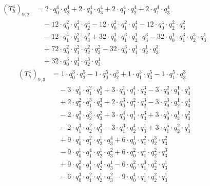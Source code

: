 \begin{align*}(T_{h}^4)_{9,2}&=2\cdot q_0^{4}\cdot q_2^{4}+2\cdot q_0^{4}\cdot q_3^{4}+2\cdot q_1^{4}\cdot q_2^{4}+2\cdot q_1^{4}\cdot q_3^{4}\\
&\quad -12\cdot q_0^{2}\cdot q_1^{2}\cdot q_2^{4}-12\cdot q_0^{2}\cdot q_1^{2}\cdot q_3^{4}-12\cdot q_0^{4}\cdot q_2^{2}\cdot q_3^{2}\\
&\quad -12\cdot q_1^{4}\cdot q_2^{2}\cdot q_3^{2}+32\cdot q_0^{1}\cdot q_1^{3}\cdot q_2^{1}\cdot q_3^{3}-32\cdot q_0^{1}\cdot q_1^{3}\cdot q_2^{3}\cdot q_3^{1}\\
&\quad +72\cdot q_0^{2}\cdot q_1^{2}\cdot q_2^{2}\cdot q_3^{2}-32\cdot q_0^{3}\cdot q_1^{1}\cdot q_2^{1}\cdot q_3^{3}\\
&\quad +32\cdot q_0^{3}\cdot q_1^{1}\cdot q_2^{3}\cdot q_3^{1}\end{align*}
\begin{align*}(T_{h}^4)_{9,3}&=1\cdot q_0^{3}\cdot q_2^{5}-1\cdot q_0^{5}\cdot q_2^{3}+1\cdot q_1^{3}\cdot q_3^{5}-1\cdot q_1^{5}\cdot q_3^{3}\\
&\quad -3\cdot q_0^{1}\cdot q_1^{2}\cdot q_2^{5}+3\cdot q_0^{1}\cdot q_1^{4}\cdot q_2^{3}-3\cdot q_0^{2}\cdot q_1^{1}\cdot q_3^{5}\\
&\quad +2\cdot q_0^{2}\cdot q_1^{3}\cdot q_3^{3}+2\cdot q_0^{3}\cdot q_1^{2}\cdot q_2^{3}-3\cdot q_0^{3}\cdot q_2^{1}\cdot q_3^{4}\\
&\quad -2\cdot q_0^{3}\cdot q_2^{3}\cdot q_3^{2}+3\cdot q_0^{4}\cdot q_1^{1}\cdot q_3^{3}+3\cdot q_0^{5}\cdot q_2^{1}\cdot q_3^{2}\\
&\quad -2\cdot q_1^{3}\cdot q_2^{2}\cdot q_3^{3}-3\cdot q_1^{3}\cdot q_2^{4}\cdot q_3^{1}+3\cdot q_1^{5}\cdot q_2^{2}\cdot q_3^{1}\\
&\quad +9\cdot q_0^{1}\cdot q_1^{2}\cdot q_2^{1}\cdot q_3^{4}+6\cdot q_0^{1}\cdot q_1^{2}\cdot q_2^{3}\cdot q_3^{2}\\
&\quad -9\cdot q_0^{1}\cdot q_1^{4}\cdot q_2^{1}\cdot q_3^{2}+6\cdot q_0^{2}\cdot q_1^{1}\cdot q_2^{2}\cdot q_3^{3}\\
&\quad +9\cdot q_0^{2}\cdot q_1^{1}\cdot q_2^{4}\cdot q_3^{1}-6\cdot q_0^{2}\cdot q_1^{3}\cdot q_2^{2}\cdot q_3^{1}\\
&\quad -6\cdot q_0^{3}\cdot q_1^{2}\cdot q_2^{1}\cdot q_3^{2}-9\cdot q_0^{4}\cdot q_1^{1}\cdot q_2^{2}\cdot q_3^{1}\end{align*}
